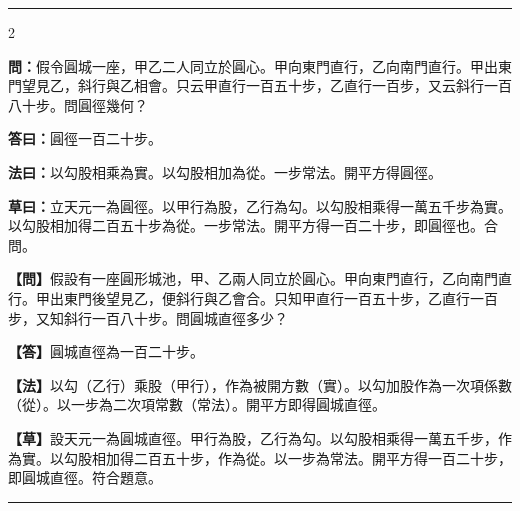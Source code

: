 \documentclass[11pt,a4paper]{article}
\newcommand{\longline}{\noindent\rule{\textwidth}{0.4pt}}
\newcommand{\wenC}[1]{\par\noindent\textbf{\textcolor{probcolor}{問：}}{#1}\par}
\newcommand{\daC}[1]{\par\noindent\textbf{\textcolor{anscolor}{答曰：}}{#1}\par}
\newcommand{\fayueC}[1]{\par\noindent\textbf{\textcolor{methodcolor}{法曰：}}{#1}\par}
\newcommand{\caoyueC}[1]{\par\noindent\textbf{草曰：}{#1}\par}
\newcommand{\wenM}[1]{\par\noindent\textbf{\textcolor{probcolor}{【問】}}{#1}\par}
\newcommand{\daM}[1]{\par\noindent\textbf{\textcolor{anscolor}{【答】}}{#1}\par}
\newcommand{\fayueM}[1]{\par\noindent\textbf{\textcolor{methodcolor}{【法】}}{#1}\par}
\newcommand{\caoyueM}[1]{\par\noindent\textbf{【草】}{#1}\par}
\begin{document}
\vspace{0.3cm}
\longline

\begin{paracol}{2}

\wenC{假令圓城一座，甲乙二人同立於圓心。甲向東門直行，乙向南門直行。甲出東門望見乙，斜行與乙相會。只云甲直行一百五十步，乙直行一百步，又云斜行一百八十步。問圓徑幾何？}

\daC{圓徑一百二十步。}

\fayueC{以勾股相乘為實。以勾股相加為從。一步常法。開平方得圓徑。}

\caoyueC{立天元一為圓徑。以甲行為股，乙行為勾。以勾股相乘得一萬五千步為實。以勾股相加得二百五十步為從。一步常法。開平方得一百二十步，即圓徑也。合問。}

\switchcolumn

\wenM{假設有一座圓形城池，甲、乙兩人同立於圓心。甲向東門直行，乙向南門直行。甲出東門後望見乙，便斜行與乙會合。只知甲直行一百五十步，乙直行一百步，又知斜行一百八十步。問圓城直徑多少？}

\daM{圓城直徑為一百二十步。}

\fayueM{以勾（乙行）乘股（甲行），作為被開方數（實）。以勾加股作為一次項係數（從）。以一步為二次項常數（常法）。開平方即得圓城直徑。}

\caoyueM{設天元一為圓城直徑。甲行為股，乙行為勾。以勾股相乘得一萬五千步，作為實。以勾股相加得二百五十步，作為從。以一步為常法。開平方得一百二十步，即圓城直徑。符合題意。}

\end{paracol}

\vspace{0.3cm}
\longline
\end{document}
